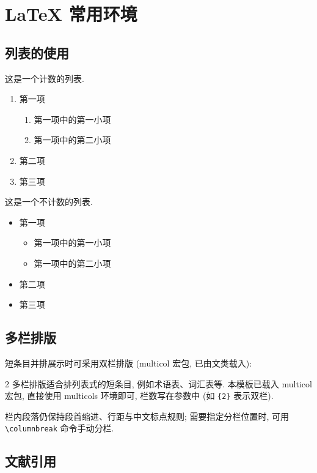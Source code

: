 

\chapter{LaTeX 常用环境}

\section{列表的使用}

这是一个计数的列表.
\begin{enumerate}%
	\item 第一项
		\begin{enumerate}
			\item 第一项中的第一小项
			\item 第一项中的第二小项
		\end{enumerate}
	\item 第二项
	\item 第三项
\end{enumerate}

这是一个不计数的列表.
\begin{itemize}%
	\item 第一项
	\begin{itemize}
		\item 第一项中的第一小项
		\item 第一项中的第二小项
	\end{itemize}
	\item 第二项
	\item 第三项
\end{itemize}


\section{多栏排版}

短条目并排展示时可采用双栏排版 (multicol 宏包, 已由文类载入):

\begin{multicols}{2}
多栏排版适合排列表式的短条目, 例如术语表、词汇表等. 本模板已载入 multicol 宏包, 直接使用 multicols 环境即可, 栏数写在参数中 (如 \verb|{2}| 表示双栏).

栏内段落仍保持段首缩进、行距与中文标点规则; 需要指定分栏位置时, 可用 \verb|\columnbreak| 命令手动分栏.
\end{multicols}


\section{文献引用}

